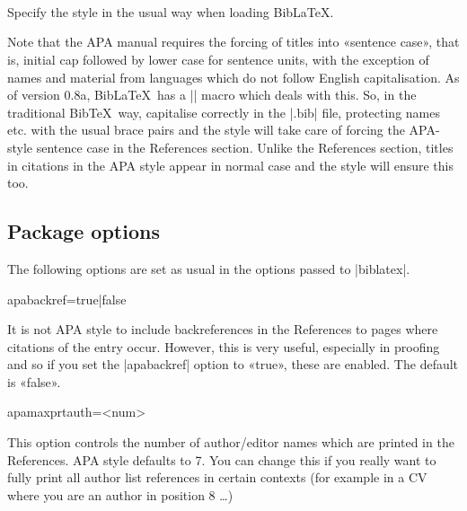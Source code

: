 \documentclass{ltxdockit}
\begin{document}
\noindent{}\\
\\
\\

\noindent Specify the style in the usual way when loading Bib\LaTeX. 

\begin{ltxcode}
\usepackage[american]{babel}
\usepackage{csquotes}
\usepackage[style=apa]{biblatex}
\end{ltxcode}

\noindent Note that the APA manual requires the forcing of titles into
«sentence case», that is, initial cap followed by lower case for sentence
units, with the exception of names and material from languages which do not
follow English capitalisation. As of version 0.8a, Bib\LaTeX\ has a
|\MakeSentenceCase| macro which deals with this. So, in the traditional
Bib\TeX\ way, capitalise correctly in the |.bib| file, protecting names etc.
with the usual brace pairs and the style will take care of forcing the
APA-style sentence case in the References section. Unlike the References
section, titles in citations in the APA style appear in normal case and the
style will ensure this too.

\subsection{Package options}\label{opts}

The following options are set as usual in the options passed to
|biblatex|.

\begin{ltxcode}
apabackref=true|false
\end{ltxcode}%

\noindent It is not APA style to include backreferences in the References to
pages where citations of the entry occur. However, this is very
useful, especially in proofing and so if you set the |apabackref|
option to «true», these are enabled. The default is «false».

\begin{ltxcode}
apamaxprtauth=<num>
\end{ltxcode}

\noindent This option controls the number of author/editor names which are
printed in the References. APA style defaults to 7. You can change this if
you really want to fully print all author list references in certain
contexts (for example in a CV where you are an author in position 8 \ldots)
\end{document}
